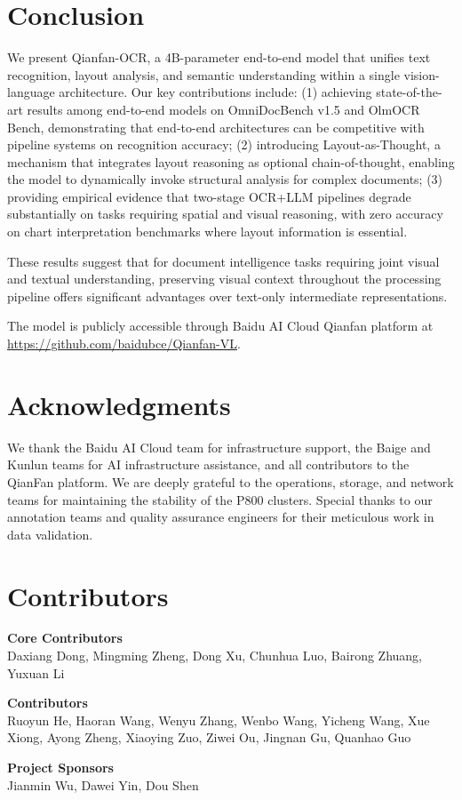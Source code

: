 \documentclass[dvipsnames]{article}
\begin{document}
\section{Conclusion}

We present Qianfan-OCR, a 4B-parameter end-to-end model that unifies text recognition, layout analysis, and semantic understanding within a single vision-language architecture. Our key contributions include: (1) achieving state-of-the-art results among end-to-end models on OmniDocBench v1.5 and OlmOCR Bench, demonstrating that end-to-end architectures can be competitive with pipeline systems on recognition accuracy; (2) introducing Layout-as-Thought, a mechanism that integrates layout reasoning as optional chain-of-thought, enabling the model to dynamically invoke structural analysis for complex documents; (3) providing empirical evidence that two-stage OCR+LLM pipelines degrade substantially on tasks requiring spatial and visual reasoning, with zero accuracy on chart interpretation benchmarks where layout information is essential.

These results suggest that for document intelligence tasks requiring joint visual and textual understanding, preserving visual context throughout the processing pipeline offers significant advantages over text-only intermediate representations.

The model is publicly accessible through Baidu AI Cloud Qianfan platform at \url{https://github.com/baidubce/Qianfan-VL}.

\section*{Acknowledgments}

We thank the Baidu AI Cloud team for infrastructure support, the Baige and Kunlun teams for AI infrastructure assistance, and all contributors to the QianFan platform. We are deeply grateful to the operations, storage, and network teams for maintaining the stability of the P800 clusters. Special thanks to our annotation teams and quality assurance engineers for their meticulous work in data validation.

\clearpage
\section*{Contributors}

\textbf{Core Contributors} \\
Daxiang Dong, Mingming Zheng, Dong Xu, Chunhua Luo, Bairong Zhuang, Yuxuan Li

\vspace{0.5em}
\textbf{Contributors} \\
Ruoyun He, Haoran Wang, Wenyu Zhang, Wenbo Wang, Yicheng Wang, Xue Xiong, Ayong Zheng, Xiaoying Zuo, Ziwei Ou, Jingnan Gu, Quanhao Guo

\vspace{0.5em}
\textbf{Project Sponsors} \\
Jianmin Wu, Dawei Yin, Dou Shen


\end{document}
